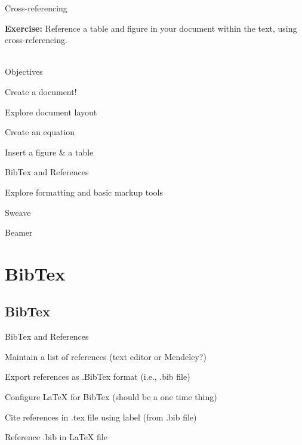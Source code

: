 \documentclass[xcolor=dvipsnames]{beamer}
\begin{document}
\begin{frame}{\LARGE{Cross-referencing}}

{\Large \textbf{Exercise:} Reference a table and figure in your document within the text, using cross-referencing.}\\
\hrulefill ~\\

\end{frame}

\begin{frame}{\LARGE{Objectives}}
\begin{itemize}
\Large{
\item Create a document! \checkmark
\item Explore document layout \checkmark
\item Create an equation \checkmark
\item Insert a figure \& a table \checkmark
\item BibTex and References
\item Explore formatting and basic markup tools
\item Sweave
\item Beamer}
\begin{center}

\end{center}
\end{itemize}
\end{frame}

\section{BibTex}
\subsection{BibTex}

\begin{frame}{\LARGE{BibTex and References}}
\begin{itemize}
\Large{
\item Maintain a list of references (text editor or Mendeley?)
\item Export references as .BibTex format (i.e., .bib file)
\item Configure LaTeX for BibTex (should be a one time thing)
\item Cite references in .tex file using label (from .bib file)
\item Reference .bib in LaTeX file}
\end{itemize}
\end{frame}
\end{document}
